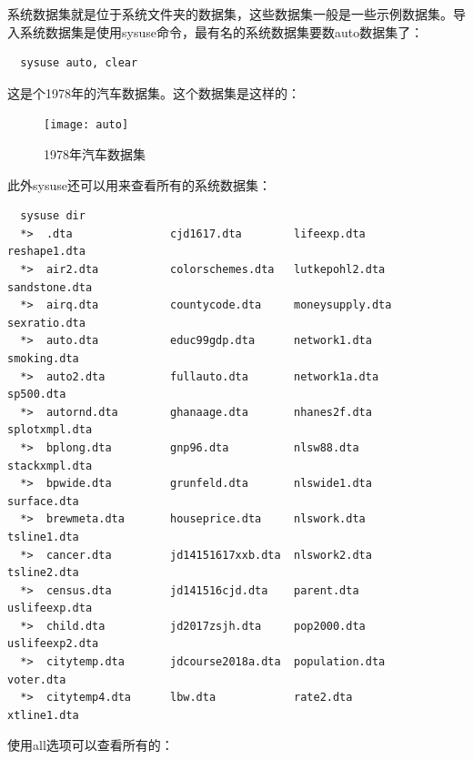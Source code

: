 \documentclass[cn,fancy,blue,11pt]{elegantbook}
\begin{document}
系统数据集就是位于系统文件夹的数据集，这些数据集一般是一些示例数据集。导入系统数据集是使用sysuse命令，最有名的系统数据集要数auto数据集了：

\begin{lstlisting}
  sysuse auto, clear
\end{lstlisting}

这是个1978年的汽车数据集。这个数据集是这样的：

\begin{figure}[htbp]
  \centering \texttt{[image: auto]}
  \caption{1978年汽车数据集}
  \label{fig:auto}
\end{figure}

此外sysuse还可以用来查看所有的系统数据集：

\begin{lstlisting}
  sysuse dir
  *>  .dta               cjd1617.dta        lifeexp.dta        reshape1.dta
  *>  air2.dta           colorschemes.dta   lutkepohl2.dta     sandstone.dta
  *>  airq.dta           countycode.dta     moneysupply.dta    sexratio.dta
  *>  auto.dta           educ99gdp.dta      network1.dta       smoking.dta
  *>  auto2.dta          fullauto.dta       network1a.dta      sp500.dta
  *>  autornd.dta        ghanaage.dta       nhanes2f.dta       splotxmpl.dta
  *>  bplong.dta         gnp96.dta          nlsw88.dta         stackxmpl.dta
  *>  bpwide.dta         grunfeld.dta       nlswide1.dta       surface.dta
  *>  brewmeta.dta       houseprice.dta     nlswork.dta        tsline1.dta
  *>  cancer.dta         jd14151617xxb.dta  nlswork2.dta       tsline2.dta
  *>  census.dta         jd141516cjd.dta    parent.dta         uslifeexp.dta
  *>  child.dta          jd2017zsjh.dta     pop2000.dta        uslifeexp2.dta
  *>  citytemp.dta       jdcourse2018a.dta  population.dta     voter.dta
  *>  citytemp4.dta      lbw.dta            rate2.dta          xtline1.dta
\end{lstlisting}

使用all选项可以查看所有的：
\end{document}
